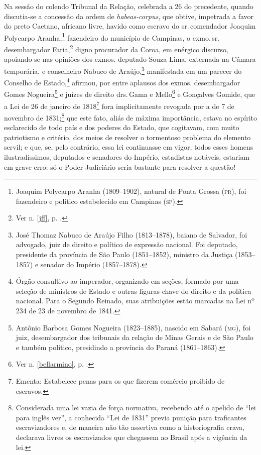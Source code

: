 {
Na sessão do colendo Tribunal da Relação, celebrada a 26 do precedente,
quando discutia-se a concessão da ordem de \emph{habeas-corpus}, que
obtive, impetrada a favor do preto Caetano, africano livre, havido como
escravo do sr.\,comendador Joaquim Polycarpo Aranha,\footnote{Joaquim \label{aranha}
  Polycarpo Aranha (1809--1902), natural de Ponta Grossa (\textsc{pr}), foi
  fazendeiro e político estabelecido em Campinas (\textsc{sp}).} fazendeiro do
município de Campinas, o exmo.\,sr.\,desembargador Faria,\footnote{Ver n. \ref{jff}, p. \pageref{jff}.} digno procurador da Coroa, em enérgico discurso,
apoiando-se nas opiniões dos exmos. deputado Souza Lima, externada na
Câmara temporária, e conselheiro Nabuco de Araújo,\footnote{José
  Thomaz Nabuco de Araújo Filho (1813--1878), baiano de Salvador, foi
  advogado, juiz de direito e político de expressão nacional. Foi
  deputado, presidente da província de São Paulo (1851--1852), ministro
  da Justiça (1853--1857) e senador do Império (1857--1878).} manifestada
em um parecer do Conselho de Estado,\footnote{Órgão consultivo ao
  imperador, organizado em seções, formado por uma seleção de ministros
  de Estado e outras figuras-chave do direito e da política nacional.
  Para o Segundo Reinado, suas atribuições estão marcadas na Lei nº 234
  de 23 de novembro de 1841.} afirmou, por entre aplausos dos exmos.
desembargador Gomes Nogueira\footnote{Antônio Barbosa Gomes Nogueira
  (1823--1885), nascido em Sabará (\textsc{mg}), foi juiz, desembargador dos
  tribunais da relação de Minas Gerais e de São Paulo e também
  político, presidindo a província do Paraná (1861--1863).} e juízes de
direito drs.\,Gama e Mello\footnote{Ver n. \ref{bellarmino}, p. \pageref{bellarmino}.} e Gonçalves
Gomide, que a Lei de 26 de janeiro de 1818\footnote{Ementa: Estabelece
  penas para os que fizerem comércio proibido de escravos.} fora
implicitamente revogada por a de 7 de novembro de 1831;\footnote{
  Considerada uma lei vazia de força normativa, recebendo até o apelido
  de ``lei para inglês ver'', a conhecida ``Lei de 1831'' previa punição
  para traficantes escravizadores e, de maneira não tão assertiva como a
  historiografia crava, declarava livres os escravizados que chegassem
  ao Brasil após a vigência da lei.} que este fato, aliás de máxima
importância, estava no espírito esclarecido de todo país e dos poderes
do Estado, que cogitavam, com muito patriotismo e critério, dos meios de
resolver o tormentoso problema do elemento servil; e que, se, pelo
contrário, essa lei continuasse em vigor, todos esses homens
ilustradíssimos, deputados e senadores do Império, estadistas notáveis,
estariam em grave erro: só o Poder Judiciário seria bastante para
resolver a questão!

}
